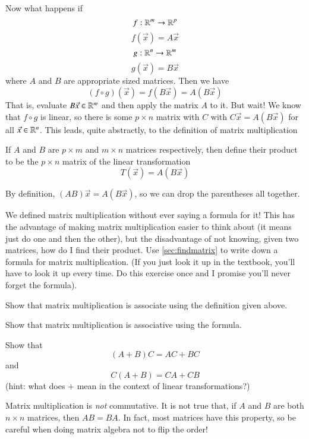 Now what happens if
\[f:\mathbb{R}^m\to \mathbb{R}^p\]
\[f (\vec{x}) = A\vec{x}\]
\[g:\mathbb{R}^n\to \mathbb{R}^m\]
\[g (\vec{x}) = B\vec{x}\]
where $A$ and $B$ are appropriate sized matrices.  
Then we have
\[(f\circ g)(\vec{x}) = f(B\vec{x}) = A(B\vec{x})\]
That is, evaluate $B\vec{x}\in \mathbb{R}^m$ and then apply the matrix $A$ to it.
But wait!
We know that $f\circ g$ is linear, so there is some $p\times n$ matrix with $C$ with $C\vec{x}=A(B\vec{x})$ for all $\vec{x}\in \mathbb{R}^n$.  
This leads, quite abstractly, to the definition of matrix multiplication
\begin{Def}
  If $A$ and $B$ are $p\times m$ and $m\times n$ matrices respectively, then define their product to be the $p\times n$ matrix of the linear transformation
  \[T(\vec{x}) = A(B\vec{x})\]
\end{Def}
\begin{Remark}
  By definition, $(AB)\vec{x} = A(B\vec{x})$, so we can drop the parentheses all together.
\end{Remark}
\begin{Ex}
  We defined matrix multiplication without ever saying a formula for it!
  This has the advantage of making matrix multiplication easier to think about (it means just do one and then the other), but the disadvantage of not knowing, given two matrices, how do I find their product.  
  Use \ref{sec:findmatrix} to write down a formula for matrix multiplication.  
  (If you just look it up in the textbook, you'll have to look it up every time.  Do this exercise once and I promise you'll never forget the formula).
\end{Ex}
\begin{EasyEx}
  Show that matrix multiplication is associate using the definition given above.
\end{EasyEx}
\begin{HardEx}
  Show that matrix multiplication is associative using the formula.  
\end{HardEx}
\begin{EasyEx}
  Show that 
  \[(A+B)C = AC + BC\]
  and
  \[C(A+B) = CA + CB\]
  (hint: what does $+$ mean in the context of linear transformations?)
\end{EasyEx}
\begin{Remark}
  Matrix multiplication is \emph{not} commutative.
  It is not true that, if $A$ and $B$ are both $n\times n$ matrices, then $AB=BA$.
  In fact, most matrices have this property, so be careful when doing matrix algebra not to flip the order!
\end{Remark}

